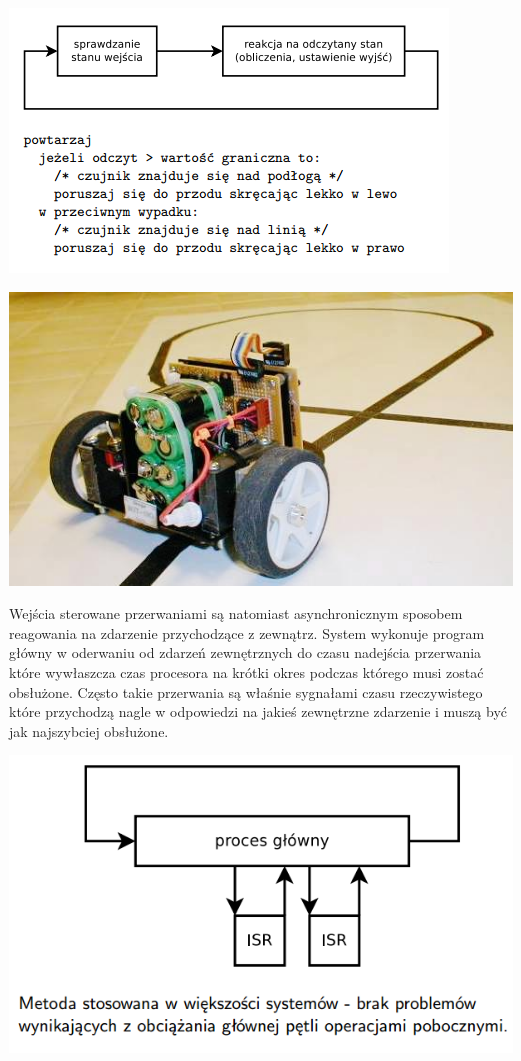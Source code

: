 \centerline{\includegraphics[scale=0.75]{./img/target_system/continius_sampling.png}}
\centerline{\includegraphics[scale=0.35]{./img/target_system/line_following_robot.jpg}}

\par
\tab Wejścia sterowane przerwaniami są natomiast asynchronicznym sposobem reagowania na zdarzenie przychodzące z zewnątrz. System wykonuje program główny w oderwaniu od zdarzeń zewnętrznych do czasu nadejścia przerwania które wywłaszcza czas procesora na krótki okres podczas którego musi zostać obsłużone. Często takie przerwania są właśnie sygnałami czasu rzeczywistego które przychodzą nagle w odpowiedzi na jakieś zewnętrzne zdarzenie i muszą być jak najszybciej obsłużone. \\ 

\centerline{\includegraphics[scale=0.50]{./img/target_system/interrupt_driven_port.png}}

